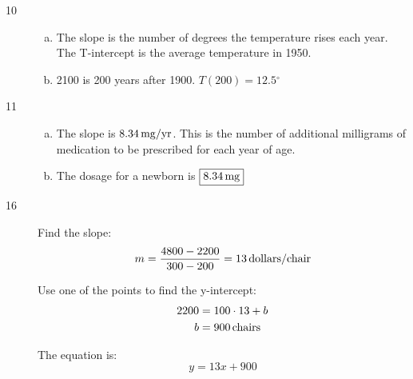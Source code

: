 \documentclass[letterpaper, landscape]{exam}
\newcommand{\dg}{\ensuremath{^\circ}}
\begin{document}
\begin{description}
      \item[10] 
        \begin{enumerate}[(a)]
          \item The slope is the number of degrees the temperature rises each
            year. The T-intercept is the average temperature in 1950.

          \item 2100 is 200 years after 1900. $T(200) = \boxed{ 12.5 \dg }$
        \end{enumerate}

      \item[11] 
        \begin{enumerate}[(a)]
          \item The slope is $\unit[8.34]{mg/yr}$. This is the number of
            additional milligrams of medication to be prescribed for each year
            of age.

          \item The dosage for a newborn is $\boxed{ \unit[8.34]{mg} }$
        \end{enumerate}

      \item[16]
        Find the slope:
        \[
          m = \frac{4800 - 2200}{300 - 200} = \unit[13]{dollars/chair}
        \]

        Use one of the points to find the y-intercept:
        \begin{align*}
          2200 & = 100 \cdot 13 + b \\
          b    & = \unit[900]{chairs} \\
        \end{align*}

        The equation is:
        \[
          y = 13 x + 900
        \]

    \end{description}
\end{document}
